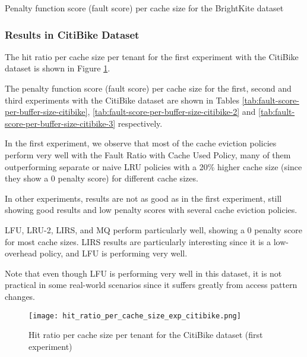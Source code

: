 \begin{table}[H]
    \centering
    \small
    \caption{Penalty function score (fault score) per cache size for the BrightKite dataset}
    \label{tab:fault-score-per-buffer-size-brightkite}
\end{table}

\subsubsection*{Results in CitiBike Dataset}

The hit ratio per cache size per tenant for the first experiment with the CitiBike dataset is
shown in Figure \ref{fig:hit_ratio_per_cache_size_exp_citibike}.

The penalty function score (fault score) per cache size for the first, second and third 
experiments with the CitiBike dataset are shown in Tables 
\ref{tab:fault-score-per-buffer-size-citibike}, \ref{tab:fault-score-per-buffer-size-citibike-2}
and \ref{tab:fault-score-per-buffer-size-citibike-3} respectively.

In the first experiment, we observe that most of the cache eviction policies perform very 
well with the Fault Ratio with Cache Used Policy, many of them outperforming separate or 
naive LRU  policies with a 20\% higher cache size (since they show a 0 penalty score) for 
different cache sizes.

In other experiments, results are not as good as in the first experiment, still showing
good results and low penalty scores with several cache eviction policies.

LFU, LRU-2, LIRS, and MQ perform particularly well, showing a 0 penalty score for most cache 
sizes. LIRS results are particularly interesting since it is a low-overhead policy, 
and LFU is performing very well. 

Note that even though LFU is performing very well in this dataset, it is not practical in some 
real-world scenarios since it suffers greatly from access pattern changes.

\begin{figure}[H]
    \centering
    \texttt{[image: hit\_ratio\_per\_cache\_size\_exp\_citibike.png]}
    \caption{Hit ratio per cache size per tenant for the CitiBike dataset (first experiment)}
    \label{fig:hit_ratio_per_cache_size_exp_citibike}
\end{figure}

\newpage

